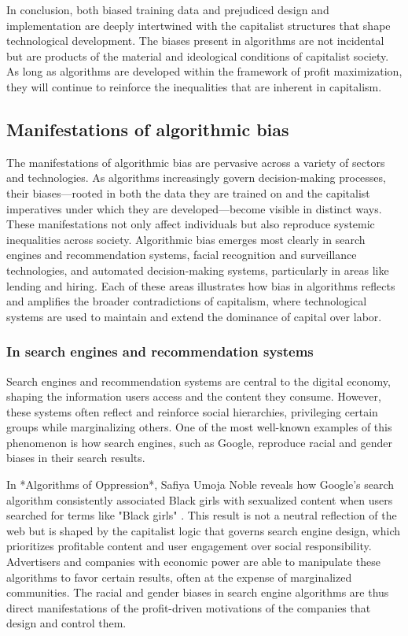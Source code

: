 In conclusion, both biased training data and prejudiced design and implementation are deeply intertwined with the capitalist structures that shape technological development. The biases present in algorithms are not incidental but are products of the material and ideological conditions of capitalist society. As long as algorithms are developed within the framework of profit maximization, they will continue to reinforce the inequalities that are inherent in capitalism.

\subsection{Manifestations of algorithmic bias}

The manifestations of algorithmic bias are pervasive across a variety of sectors and technologies. As algorithms increasingly govern decision-making processes, their biases—rooted in both the data they are trained on and the capitalist imperatives under which they are developed—become visible in distinct ways. These manifestations not only affect individuals but also reproduce systemic inequalities across society. Algorithmic bias emerges most clearly in search engines and recommendation systems, facial recognition and surveillance technologies, and automated decision-making systems, particularly in areas like lending and hiring. Each of these areas illustrates how bias in algorithms reflects and amplifies the broader contradictions of capitalism, where technological systems are used to maintain and extend the dominance of capital over labor.

\subsubsection{In search engines and recommendation systems}

Search engines and recommendation systems are central to the digital economy, shaping the information users access and the content they consume. However, these systems often reflect and reinforce social hierarchies, privileging certain groups while marginalizing others. One of the most well-known examples of this phenomenon is how search engines, such as Google, reproduce racial and gender biases in their search results.

In *Algorithms of Oppression*, Safiya Umoja Noble reveals how Google’s search algorithm consistently associated Black girls with sexualized content when users searched for terms like "Black girls" \cite[pp.~64-66]{noble2019}. This result is not a neutral reflection of the web but is shaped by the capitalist logic that governs search engine design, which prioritizes profitable content and user engagement over social responsibility. Advertisers and companies with economic power are able to manipulate these algorithms to favor certain results, often at the expense of marginalized communities. The racial and gender biases in search engine algorithms are thus direct manifestations of the profit-driven motivations of the companies that design and control them.

